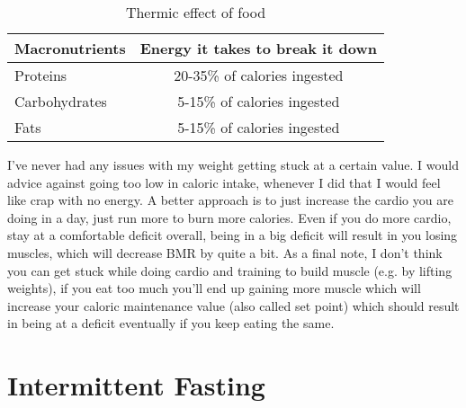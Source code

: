 \documentclass[openany, 12pt]{book}
\begin{document}
        \begin{table}
          \centering
          \begin{tabular}{|l|c|}
            \hline
            \textbf{Macronutrients} & \textbf{Energy it takes to break it down}  \\
            \hline
            Proteins & 20-35\% of calories ingested \\
            \hline
            Carbohydrates & 5-15\% of calories ingested \\
            \hline
            Fats & 5-15\% of calories ingested \\
            \hline
          \end{tabular}
          \caption{Thermic effect of food}
          \label{table1}
        \end{table}

        I've never had any issues with my weight getting stuck at a certain value. I would advice against going too low in caloric intake, whenever I did that I would feel like crap with no energy.
        A better approach is to just increase the cardio you are doing in a day, just run more to burn more calories. Even if you do more cardio, stay at a comfortable deficit overall, being in
        a big deficit will result in you losing muscles, which will decrease BMR by quite a bit. As a final note, I don't think you can get stuck while doing cardio and training to build muscle
        (e.g. by lifting weights), if you eat too much you'll end up gaining more muscle which will increase your caloric maintenance value (also called set point) which should result in
        being at a deficit eventually if you keep eating the same.


        \section{Intermittent Fasting}
\end{document}
